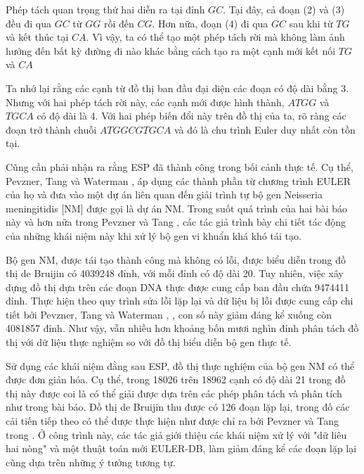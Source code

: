 \documentclass[14pt, a4paper]{article}
\numberwithin{equation}{section}
\numberwithin{figure}{section}
\numberwithin{dl}{section}
\numberwithin{md}{section}
\numberwithin{bd}{section}
\numberwithin{dn}{section}
\numberwithin{hq}{section}
\begin{document}
    Phép tách quan trọng thứ hai diễn ra tại đỉnh $GC$. Tại đây, cả đoạn (2) và (3) đều đi qua $GC$ từ $GG$ rồi đến $CG$. 
    Hơn nữa, đoạn (4) đi qua $GC$ sau khi từ $TG$ và kết thúc tại $CA$.
    Vì vậy, ta có thể tạo một phép tách rời mà không làm ảnh hưởng đến bất kỳ đường đi nào khác bằng cách tạo ra một cạnh mới kết nối $TG$ và $CA$

    Ta nhớ lại rằng các cạnh từ đồ thị ban đầu đại diện các đoạn có độ dài bằng 3.
    Nhưng với hai phép tách rời này, các cạnh mới được hình thành, $ATGG$ và $TGCA$ có độ dài là 4.
    Với hai phép biến đổi này trên đồ thị của ta, rõ ràng các đoạn trở thành chuỗi $ATGGCGTGCA$ và đó là chu trình Euler duy nhất còn tồn tại.

    Cũng cần phải nhận ra rằng ESP đã thành công trong bối cảnh thực tế.
    Cụ thể, Pevzner, Tang và Waterman \cite{pevzner2001eulerian}, \cite{pevzner2001new} áp dụng các thành phần từ chương trình EULER của họ và đưa vào một dự án liên quan đến giải trình tự bộ gen Neisseria meningitidis [NM] được gọi là dự án NM.
    Trong suốt quá trình của hai bài báo này và hơn nữa trong Pevzner và Tang \cite{pevzner2001fragment}, các tác giả trình bày chi tiết tác động của những khái niệm này khi xử lý bộ gen vi khuẩn khá khó tái tạo.

    Bộ gen NM, được tái tạo thành công mà không có lỗi, được biểu diễn trong đồ thị de Bruijin có 4039248 đỉnh, với mỗi đỉnh có độ dài 20.
    Tuy nhiên, việc xây dựng đồ thị dựa trên các đoạn DNA thực được cung cấp ban đầu chứa 9474411 đỉnh.
    Thực hiện theo quy trình sửa lỗi lặp lại và dữ liệu bị lỗi được cung cấp chi tiết bởi Pevzner, Tang và Waterman \cite{pevzner2001eulerian}, \cite{pevzner2001new}, con số này giảm đáng kể xuống còn 4081857 đỉnh.
    Như vậy, vẫn nhiều hơn khoảng bốn mươi nghìn đỉnh phân tách đồ thị với dữ liệu thực nghiệm so với đồ thị biểu diễn bộ gen thực tế.

    Sử dụng các khái niệm đằng sau ESP, đồ thị thực nghiệm của bộ gen NM có thể được đơn giản hóa.
    Cụ thể, trong 18026 trên 18962 cạnh có độ dài 21 trong đồ thị này được coi là có thể giải được dựa trên các phép phân tách và phân tích như trong bài báo.
    Đồ thị de Bruijin thu được có 126 đoạn lặp lại, trong đố các cải tiến tiếp theo có thể được thực hiện như được chỉ ra bởi Pevzner và Tang trong \cite{pevzner2001fragment}.
    Ở công trình này, các tác giả giới thiệu các khái niệm xử lý với "dữ liêu hai nòng" và một thuật toán mới EULER-DB, làm giảm đáng kể các đoạn lặp lại cũng dựa trên những ý tưởng tương tự.
\end{document}
